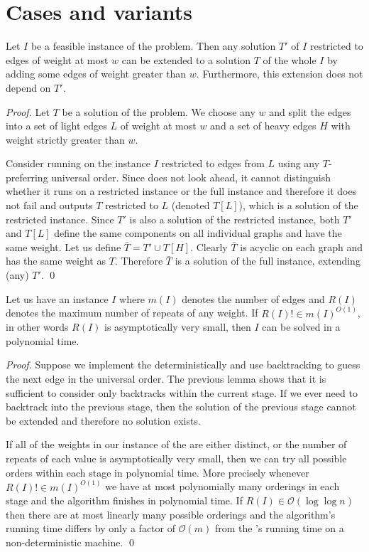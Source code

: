 \section{Cases and variants}

\begin{lemma}\label{lem:selfred}
Let $I$ be a feasible instance of the \SMST problem. Then any solution $T'$ of $I$ restricted to edges of weight at most $w$ can be extended to a solution $T$ of the whole $I$ by adding some edges of weight greater than $w$. Furthermore, this extension does not depend on $T'$. 
\end{lemma}
\begin{proof}
Let $T$ be a solution of the \SMST problem. We choose any $w$ and split the edges into a set of light edges $L$ of weight at most $w$ and a set of heavy edges $H$ with weight strictly greater than $w$. 

Consider running \SKA on the instance $I$ restricted to edges from $L$ using any $T$-preferring universal order. Since \SKA does not look ahead, it cannot distinguish whether it runs on a restricted instance or the full instance and therefore it does not fail and outputs $T$ restricted to $L$ (denoted $T[L]$), which is a solution of the restricted instance. Since $T'$ is also a solution of the restricted instance, both $T'$ and $T[L]$ define the same components on all individual graphs and have the same weight. Let us define $\bar{T} = T'\cup T[H]$. Clearly $\bar{T}$ is acyclic on each graph and has the same weight as $T$. Therefore $\bar{T}$ is a solution of the full instance, extending (any) $T'$. \qed
\end{proof}

\begin{observation}\label{cor:trivialstages}
Let us have an \SMST instance $I$ where $m(I)$ denotes the number of edges and $R(I)$ denotes the maximum number of repeats of any weight. If $R(I)! \in m(I)^{O(1)}$, in other words $R(I)$ is asymptotically very small, then $I$ can be solved in a polynomial time. 
\end{observation}
\begin{proof}
Suppose we implement the \NSKA deterministically and use backtracking to guess the next edge in the universal order. The previous lemma shows that it is sufficient to consider only backtracks within the current stage. If we ever need to backtrack into the previous stage, then the solution of the previous stage cannot be extended and therefore no solution exists. 

If all of the weights in our instance of the \SMST are either distinct, or the number of repeats of each value is asymptotically very small, then we can try all possible orders within each stage in polynomial time. More precisely whenever $R(I)! \in m(I)^{O(1)}$ we have at most polynomially many orderings in each stage and the algorithm finishes in polynomial time. If $R(I) \in \mathcal{O}(\log\log n)$ then there are at most linearly many possible orderings and the algorithm's running time differs by only a factor of $\mathcal{O}(m)$ from the \NSKA's running time on a non-deterministic machine. 
\qed
\end{proof}

